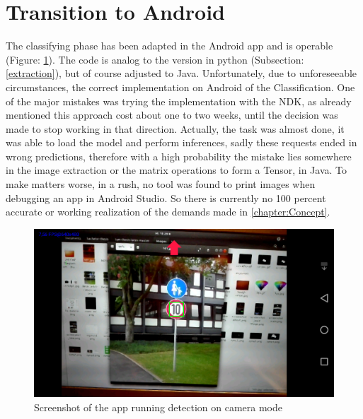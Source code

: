 \section{Transition to Android}
The classifying phase has been adapted in the Android app and is operable (Figure: \ref{fig:screenfun}). The code is analog to the version in python (Subsection: \ref{extraction}), but of course adjusted to Java. 
Unfortunately, due to unforeseeable circumstances, the correct implementation on Android of the Classification. One of the major mistakes was trying the implementation with the NDK, as already mentioned this approach cost about one to two weeks, until the decision was made to stop working in that direction. Actually, the task was almost done, it was able to load the model and perform inferences, sadly these requests ended in wrong predictions, therefore with a high probability the mistake lies somewhere in the image extraction or the matrix operations to form a Tensor, in Java. To make matters worse, in a rush, no tool was found to print images when debugging an app in Android Studio. So there is currently no 100 percent accurate or working realization of the demands made in \ref{chapter:Concept}. 
\newline

\begin{figure}[H]
	\centering
	\includegraphics[width=\linewidth]{images/screenshotfun.png}
	\caption{Screenshot of the app running detection on camera mode}\label{fig:screenfun}
\end{figure}